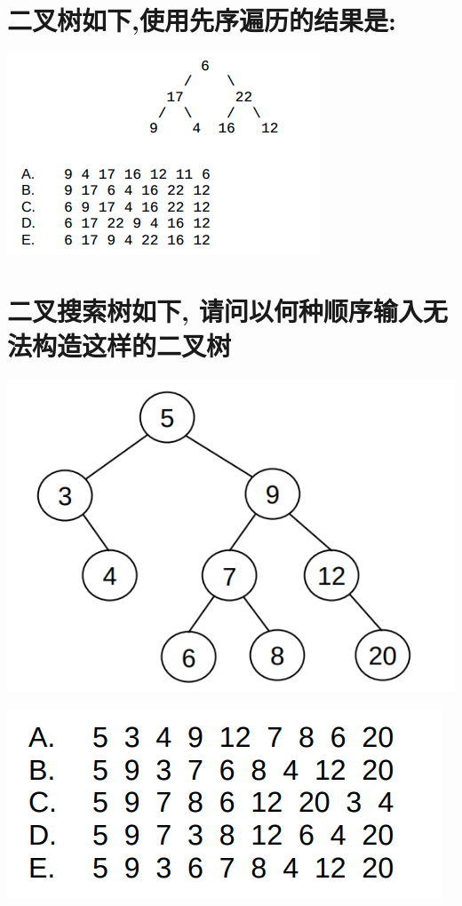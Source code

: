 \documentclass[11pt]{article}
\begin{document}
\section{二叉树如下,使用先序遍历的结果是:}
\label{sec:org32bbe59}
\begin{center}
\includegraphics[width=.9\linewidth]{./img/1234.png}
\end{center}

\section{二叉搜索树如下, 请问以何种顺序输入无法构造这样的二叉树}
\label{sec:orgc721137}

\begin{center}
\includegraphics[width=.9\linewidth]{./img/111222.png}
\end{center}

\begin{center}
\includegraphics[width=.9\linewidth]{./img/111223.png}
\end{center}
\end{document}
